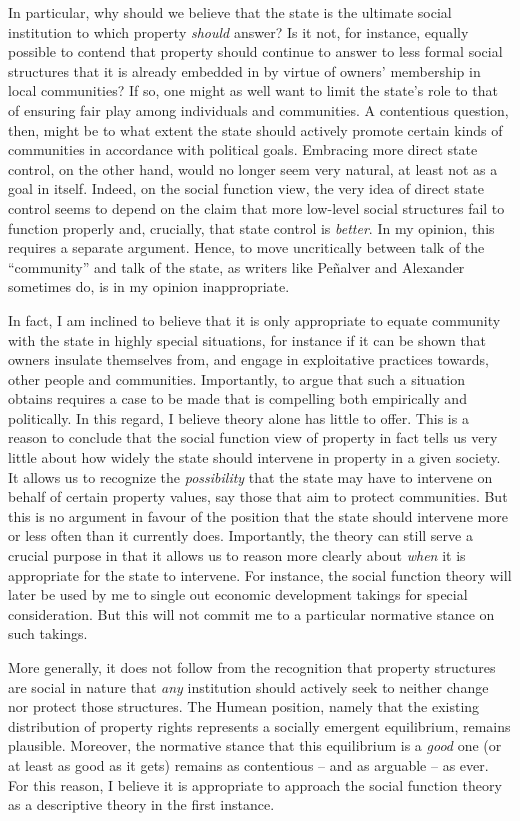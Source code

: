 \documentclass[12pt,a4paper]{book} %
\begin{document}
In particular, why should we believe that the state is the ultimate social institution to which property {\it should} answer? Is it not, for instance, equally possible to contend that property should continue to answer to less formal social structures that it is already embedded in by virtue of owners' membership in local communities? If so, one might as well want to limit the state's role to that of ensuring fair play among individuals and communities. A contentious question, then, might be to what extent the state should actively promote certain kinds of communities in accordance with political goals. Embracing more direct state control, on the other hand, would no longer seem very natural, at least not as a goal in itself. Indeed, on the social function view, the very idea of direct state control seems to depend on the claim that more low-level social structures fail to function properly and, crucially, that state control is {\it better}. In my opinion, this requires a separate argument. Hence, to move uncritically between talk of the ``community'' and talk of the state, as writers like Pe\~{n}alver and Alexander sometimes do, is in my opinion inappropriate.

In fact, I am inclined to believe that it is only appropriate to equate community with the state in highly special situations, for instance if it can be shown that owners insulate themselves from, and engage in exploitative practices towards, other people and communities. Importantly, to argue that such a situation obtains requires a case to be made that is compelling both empirically and politically. In this regard, I believe theory alone has little to offer. This is a reason to conclude that the social function view of property in fact tells us very little about how widely the state should intervene in property in a given society. It allows us to recognize the {\it possibility} that the state may have to intervene on behalf of certain property values, say those that aim to protect communities. But this is no argument in favour of the position that the state should intervene more or less often than it currently does. Importantly, the theory can still serve a crucial purpose in that it allows us to reason more clearly about {\it when} it is appropriate for the state to intervene. For instance, the social function theory will later be used by me to single out economic development takings for special consideration. But this will not commit me to a particular normative stance on such takings.

More generally, it does not follow from the recognition that property structures are social in nature that {\it any} institution should actively seek to neither change nor protect those structures. The Humean position, namely that the existing distribution of property rights represents a socially emergent equilibrium, remains plausible. Moreover, the normative stance that this equilibrium is a {\it good} one (or at least as good as it gets) remains as contentious -- and as arguable -- as ever. For this reason, I believe it is appropriate to approach the social function theory as a descriptive theory in the first instance.
\end{document}
